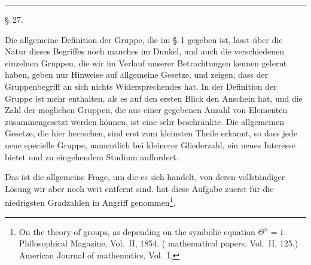 \begin{center}

\end{center}

\rule{4cm}{0.4pt}

\begin{center}
\S.\,27.

\end{center}

Die allgemeine Definition der Gruppe, die im \S.\,1 gegeben ist, lässt über die Natur dieses Begriffes noch manches im Dunkel, und auch die verschiedenen einzelnen Gruppen, die wir im Verlauf unserer Betrachtungen kennen gelernt haben, geben nur Hinweise auf allgemeine Gesetze, und zeigen, dass der Gruppenbegriff an sich nichts Widersprechendes hat. In der Definition der Gruppe ist mehr enthalten, als es auf den ersten Blick den Anschein hat, und die Zahl der möglichen Gruppen, die aus einer gegebenen Anzahl von Elementen zusammengesetzt werden können, ist eine sehr beschränkte. Die allgemeinen Gesetze, die hier herrschen, sind erst zum kleinsten Theile erkannt, so dass jede neue specielle Gruppe, namentlich bei kleinerer Gliederzahl, ein neues Interesse bietet und zu eingehendem Studium auffordert.

 Das ist die allgemeine Frage, um die es sich handelt, von deren vollständiger Lösung wir aber noch weit entfernt sind.  hat diese Aufgabe zuerst für die niedrigsten Gradzahlen in Angriff genommen\footnote{On the theory of groups, as depending on the symbolic equation $\Theta^n = 1$. Philosophical Magazine, Vol.\ II, 1854. ( mathematical papers, Vol.\ II, 125.) American Journal of mathematics, Vol.\ I.}.
